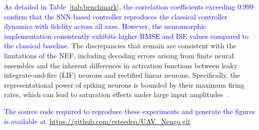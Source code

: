 \documentclass[conference]{IEEEtran}
\begin{document}
\textcolor{blue}{As detailed in Table~\ref{tab:benchmark}, the correlation coefficients exceeding $0.999$ confirm that the SNN-based controller reproduces the classical controller dynamics with fidelity across all axes. However, the neuromorphic implementation consistently exhibits higher RMSE and ISE values compared to the classical baseline.} The discrepancies that remain are consistent with the limitations of the NEF, including decoding errors arising from finite neural ensembles and the inherent differences in activation functions between leaky integrate-and-fire (LIF) neurons and rectified linear neurons. Specifically, the representational power of spiking neurons is bounded by their maximum firing rates, which can lead to saturation effects under large input amplitudes~\cite{dewolf_neuromorphic_2023,rajendran_low-power_2019}.

\textcolor{blue}{The source code required to reproduce these experiments and generate the figures is available at~\url{https://github.com/esteedeq/UAV_Nengo.git}}




\end{document}
